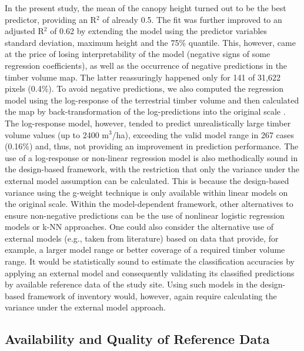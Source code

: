 In the present study, the mean of the canopy height turned out to be the best predictor, providing an R$^2$ of already 0.5. The fit was further improved to an adjusted R$^2$ of 0.62 by extending the model using the predictor variables standard deviation, maximum height and the 75\% quantile. This, however, came at the price of losing interpretability of the model (negative signs of some regression coefficients), as well as the occurrence of negative predictions in the timber volume map. The latter reassuringly happened only for 141 of 31,622 pixels (0.4\%). To avoid negative predictions, we also computed the regression model using the log-response of the terrestrial timber volume and then calculated the map by back-transformation of the log-predictions into the original scale \citep{beauchamp1973}. The log-response model, however, tended to predict unrealistically large timber volume values (up to 2400 m$^3$/ha), exceeding the valid model range in 267 cases (0.16\%) and, thus, not providing an improvement in prediction performance. The use of a log-response or non-linear regression model is also methodically sound in the design-based framework, with the restriction that only the variance under the external model assumption \citep{mandallaz2008} can be calculated. This is because the design-based variance using the g-weight technique \citep{mandallaz2013b, mandallaz2013a} is only available within linear models on the original scale. Within the model-dependent framework, other alternatives to ensure non-negative predictions can be the use of nonlinear logistic regression models \citep{mcroberts2013} or k-NN approaches. One could also consider the alternative use of external models (e.g., taken from literature) based on data that provide, for example, a larger model range or better coverage of a required timber volume range. It would be statistically sound to estimate the classification accuracies by applying an external model and consequently validating its classified predictions by available reference data of the study site. Using such models in the design-based framework of inventory would, however, again require calculating the variance under the external model approach.

\subsection{Availability and Quality of Reference Data}
\label{sec:refdata}

